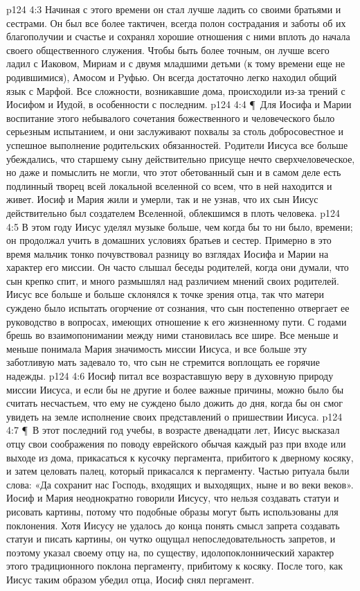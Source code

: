\vs p124 4:3 Начиная с этого времени он стал лучше ладить со своими братьями и сестрами. Он был все более тактичен, всегда полон сострадания и заботы об их благополучии и счастье и сохранял хорошие отношения с ними вплоть до начала своего общественного служения. Чтобы быть более точным, он лучше всего ладил с Иаковом, Мириам и с двумя младшими детьми (к тому времени еще не родившимися), Амосом и Pуфью. Он всегда достаточно легко находил общий язык с Марфой. Все сложности, возникавшие дома, происходили из\hyp{}за трений с Иосифом и Иудой, в особенности с последним.
\vs p124 4:4 \P\ Для Иосифа и Марии воспитание этого небывалого сочетания божественного и человеческого было серьезным испытанием, и они заслуживают похвалы за столь добросовестное и успешное выполнение родительских обязанностей. Pодители Иисуса все больше убеждались, что старшему сыну действительно присуще нечто сверхчеловеческое, но даже и помыслить не могли, что этот обетованный сын и в самом деле есть подлинный творец всей локальной вселенной со всем, что в ней находится и живет. Иосиф и Мария жили и умерли, так и не узнав, что их сын Иисус действительно был создателем Вселенной, облекшимся в плоть человека.
\vs p124 4:5 В этом году Иисус уделял музыке больше, чем когда бы то ни было, времени; он продолжал учить в домашних условиях братьев и сестер. Примерно в это время мальчик тонко почувствовал разницу во взглядах Иосифа и Марии на характер его миссии. Он часто слышал беседы родителей, когда они думали, что сын крепко спит, и много размышлял над различием мнений своих родителей. Иисус все больше и больше склонялся к точке зрения отца, так что матери суждено было испытать огорчение от сознания, что сын постепенно отвергает ее руководство в вопросах, имеющих отношение к его жизненному пути. С годами брешь во взаимопонимании между ними становилась все шире. Все меньше и меньше понимала Мария значимость миссии Иисуса, и все больше эту заботливую мать задевало то, что сын не стремится воплощать ее горячие надежды.
\vs p124 4:6 Иосиф питал все возраставшую веру в духовную природу миссии Иисуса, и если бы не другие и более важные причины, можно было бы считать несчастьем, что ему не суждено было дожить до дня, когда бы он смог увидеть на земле исполнение своих представлений о пришествии Иисуса.
\vs p124 4:7 \P\ В этот последний год учебы, в возрасте двенадцати лет, Иисус высказал отцу свои соображения по поводу еврейского обычая каждый раз при входе или выходе из дома, прикасаться к кусочку пергамента, прибитого к дверному косяку, и затем целовать палец, который прикасался к пергаменту. Частью ритуала были слова: «Да сохранит нас Господь, входящих и выходящих, ныне и во веки веков». Иосиф и Мария неоднократно говорили Иисусу, что нельзя создавать статуи и рисовать картины, потому что подобные образы могут быть использованы для поклонения. Хотя Иисусу не удалось до конца понять смысл запрета создавать статуи и писать картины, он чутко ощущал непоследовательность запретов, и поэтому указал своему отцу на, по существу, идолопоклоннический характер этого традиционного поклона пергаменту, прибитому к косяку. После того, как Иисус таким образом убедил отца, Иосиф снял пергамент.
